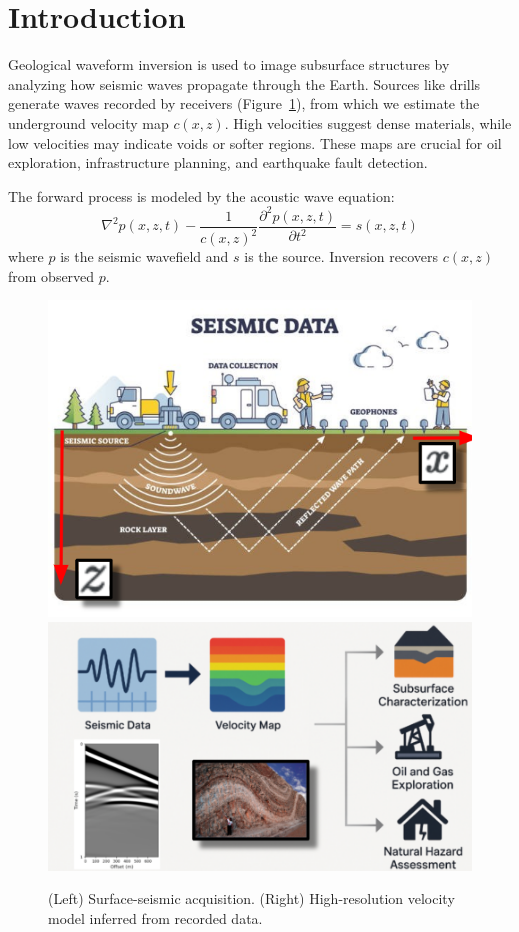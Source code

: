 \documentclass{article}
\newcommand{\instructions}[1]{{\color{blue} #1}}
\begin{document}


\section{Introduction}

Geological waveform inversion is used to image subsurface structures by analyzing how seismic waves propagate through the Earth. Sources like drills generate waves recorded by receivers (Figure~\ref{fig:intro}), from which we estimate the underground velocity map $c(x, z)$. High velocities suggest dense materials, while low velocities may indicate voids or softer regions. These maps are crucial for oil exploration, infrastructure planning, and earthquake fault detection.

\vspace{4pt}
The forward process is modeled by the acoustic wave equation:
\[
\nabla^2 p(x, z, t) - \frac{1}{c(x, z)^2} \frac{\partial^2 p(x, z, t)}{\partial t^2} = s(x, z, t)
\]
where $p$ is the seismic wavefield and $s$ is the source. Inversion recovers $c(x, z)$ from observed $p$.

\begin{figure}
    \centering
    \includegraphics[width=0.48\linewidth]{figures/intro1.png}
    \hfill
    \includegraphics[width=0.48\linewidth]{figures/intro2.png}
    \caption{(Left) Surface-seismic acquisition. (Right) High-resolution velocity model inferred from recorded data.}
    \label{fig:intro}
\end{figure}
\end{document}
